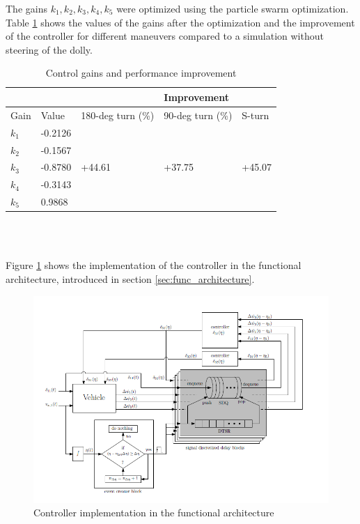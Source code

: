 \documentclass[ExampleMasters.tex]{subfiles}
\begin{document}
The gains $k_1, k_2, k_3, k_4, k_5$ were optimized using the particle swarm optimization.
Table \ref{tab:gains_after_optimization} shows the values of the gains after the optimization and the improvement of the controller for different maneuvers compared to a simulation without steering of the dolly.
\begin{table}[h]
	\centering
	\caption{Control gains and performance improvement}
	\label{tab:gains_after_optimization}
	\begin{tabular}{l|l|l l l}
		& &  & Improvement  \\ \hline
		Gain & Value & 180-deg turn (\%) & 90-deg turn (\%) & S-turn\\ \hline
		$k_1$   &       -0.2126      &             \\
		$k_2$    &            -0.1567 &             \\
		$k_3$  &      -0.8780       &           +44.61 & +37.75 & +45.07  \\
		$k_4$ &      -0.3143       &           \\
		$k_5$  & 0.9868 & \\
		
	\end{tabular} \\
\end{table}\\
Figure \ref{fig:low_speed_diagram} shows the implementation of the controller in the functional architecture, introduced in section \ref{sec:func_architecture}.

\begin{figure}[!htb]
	\centering
	\includegraphics[width=1.0\linewidth]{figures/Low_speed_diagram}
	\caption{Controller implementation in the functional architecture \cite{Low-speed_paper}}
	\label{fig:low_speed_diagram}
\end{figure}
\end{document}
